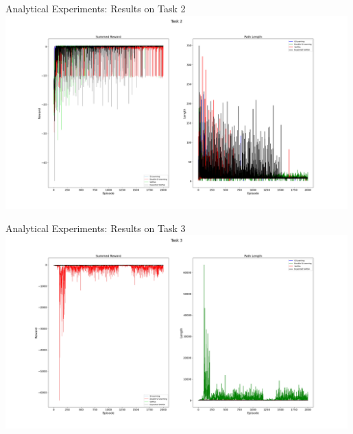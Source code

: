 \documentclass{beamer}
\begin{document}
\begin{frame}{Analytical Experiments: Results on Task 2}
  \centering
  \includegraphics[width=0.99\textwidth]{figs/Task_2.png}
\end{frame}

\begin{frame}{Analytical Experiments: Results on Task 3}
  \centering
  \includegraphics[width=0.99\textwidth]{figs/Task_3.png}
\end{frame}
\end{document}

